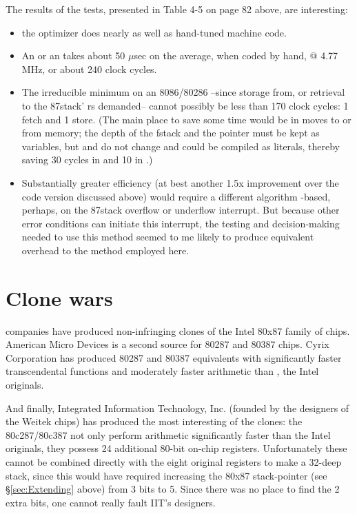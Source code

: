 The results of the tests, presented in Table 4-5 on page 82 above,
are interesting:
\begin{itemize}
    \item the optimizer does nearly as well as hand-tuned machine code.
    \item An  or an  takes about 50 $\mu$sec on the average, when coded by hand, @ 4.77 MHz, or about 240 clock cycles.
    \item The irreducible minimum on an 8086/80286 --since  storage from, or retrieval to the 87stack' rs demanded-- cannot possibly be less than 170 clock cycles: 1 fetch and 1 store. (The main place to save some time would be in moves to or from memory; the depth of the fstack and the pointer must be kept as variables, but  and  do not change and could be compiled as literals, thereby saving 30 cycles in  and 10 in .)
    \item Substantially greater efficiency (at best another 1.5x improvement over the code version discussed above) would require a different algorithm -based, perhaps, on the 87stack overflow or underflow interrupt. But because other error conditions can initiate this interrupt, the testing and decision-making needed to use this method seemed to me likely to produce equivalent overhead to the method employed here.
\end{itemize}
\section{Clone wars}

 companies have produced non-infringing clones of the Intel 80x87 family of chips. American Micro Devices is a second source for 80287 and 80387 chips. Cyrix Corporation has produced 80287 and 80387 equivalents with significantly faster transcendental functions and moderately faster arithmetic than , the Intel originals.

And finally, Integrated Information Technology, Inc. (founded by the designers of the Weitek chips) has produced the most interesting of the clones: the 80c287/80c387 not only perform arithmetic significantly faster than the Intel originals, they possess 24 additional 80-bit on-chip registers. Unfortunately these cannot be combined directly with the eight original registers to make a 32-deep stack, since this would have required increasing the 80x87 stack-pointer (see \S\ref{sec:Extending} above) from 3 bits to 5. Since there was no place to find the 2 extra bits, one cannot really fault IIT's designers.

